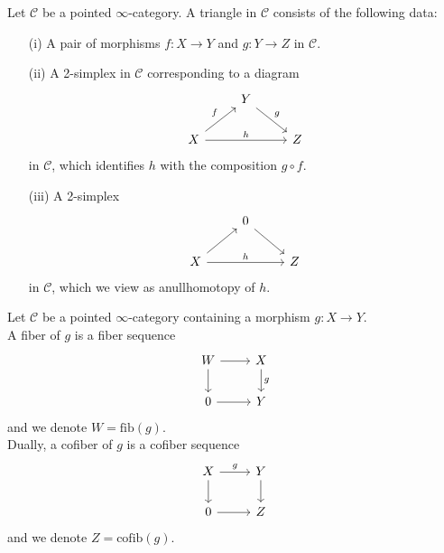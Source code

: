 \documentclass[UTF8,12,a4paper]{ctexart}
\theoremstyle{definition}
\begin{document}
\rem
Let $\mathcal{C}$ be a pointed $\infty$-category. A triangle in $\mathcal{C}$ consists of the following data:
\begin{itemize}
	\item [(i)] A pair of morphisms $f:X\to Y$ and $g:Y\to Z$ in $\mathcal{C}$.
	\item [(ii)] A 2-simplex in $\mathcal{C}$ corresponding to a diagram
	\begin{equation*}
	\begin{tikzcd}
	& Y \arrow[rd, "g"] &   \\
	X \arrow[ru, "f"] \arrow[rr, "h"] &                   & Z
	\end{tikzcd}
	\end{equation*}
	in $\mathcal{C}$, which identifies $h$ with the composition $g\circ f.$
	\item [(iii)]
	 A 2-simplex 
	 \begin{equation*}
	 \begin{tikzcd}
	 & 0 \arrow[rd] &   \\
	 X \arrow[ru] \arrow[rr, "h"] &              & Z
	 \end{tikzcd}
	 \end{equation*}
	 in $\mathcal{C}$, which we view as anullhomotopy of $h$.
\end{itemize}
\dfn 
Let $\mathcal{C}$ be a pointed $\infty$-category containing a morphism $g:X\longrightarrow Y$.\\
A fiber of $g$ is a fiber sequence
\begin{equation*}
\begin{tikzcd}
W \arrow[r ] \arrow[d] & X \arrow[d, "g"] \\
0 \arrow[r]                & Y               
\end{tikzcd}
\end{equation*}
and we denote $W=\text{fib}(g).$\\
Dually, a cofiber of $g$ is a cofiber sequence
\begin{equation*}
\begin{tikzcd}
X \arrow[r,"g" ] \arrow[d] & Y \arrow[d] \\
0 \arrow[r]                & Z               
\end{tikzcd}
\end{equation*}
and we denote $Z=\text{cofib}(g).$
\end{document}
